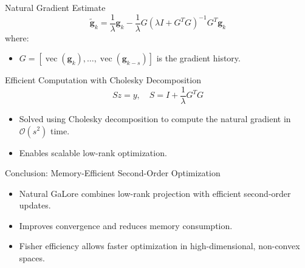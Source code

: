\documentclass{beamer}
\begin{document}
\begin{frame}{Natural Gradient Estimate}
    \begin{equation}
        \mathbf{\tilde{g}}_k = \frac{1}{\lambda}\mathbf{g}_k - \frac{1}{\lambda} G (\lambda I + G^T G)^{-1} G^T \mathbf{g}_k
    \end{equation}
    where:
    \begin{itemize}
        \item \(G = [\operatorname{vec}(\mathbf{g}_k), \ldots, \operatorname{vec}(\mathbf{g}_{k-s})]\) is the gradient history.
    \end{itemize}
\end{frame}

\begin{frame}{Efficient Computation with Cholesky Decomposition}
    \begin{equation}
        S z = y, \quad S = I + \frac{1}{\lambda} G^T G
    \end{equation}
    \begin{itemize}
        \item Solved using Cholesky decomposition to compute the natural gradient in \(\mathcal{O}(s^2)\) time.
        \item Enables scalable low-rank optimization.
    \end{itemize}
\end{frame}

\begin{frame}{Conclusion: Memory-Efficient Second-Order Optimization}
    \begin{itemize}
        \item Natural GaLore combines low-rank projection with efficient second-order updates.
        \item Improves convergence and reduces memory consumption.
        \item Fisher efficiency allows faster optimization in high-dimensional, non-convex spaces.
    \end{itemize}
\end{frame}
\end{document}

